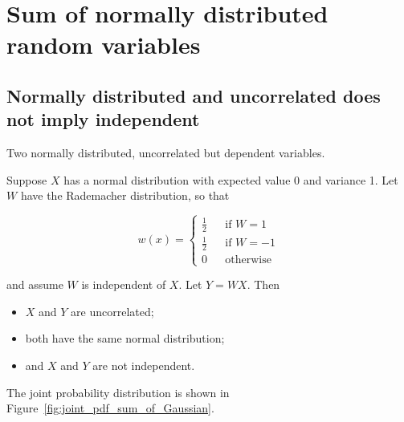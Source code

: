 

\section{Sum of normally distributed random variables}
\label{exer:sum_of_Gaussian}

\subsection{Normally distributed and uncorrelated does not imply independent}

Two normally distributed, uncorrelated but dependent variables.

Suppose $X$ has a normal distribution with expected value 0 and variance 1. Let $W$ have the Rademacher distribution, so that 

\begin{equation}\label{eq:Rademacher_distr}
	w(x) = \left\{
	\begin{array}{ccl}
		\frac{1}{2} & & {\textrm{if } W = 1}\\
		\frac{1}{2} & & {\textrm{if } W = - 1}\\
		0 & & {\textrm{otherwise}}
	\end{array} \right.
\end{equation}

and assume $W$ is independent of $X$. Let $Y=WX$. Then
\begin{itemize}
	\item $X$ and $Y$ are uncorrelated;
	\item both have the same normal distribution;
	\item and $X$ and $Y$ are not independent.
\end{itemize}

The joint probability distribution is shown in Figure~\ref{fig:joint_pdf_sum_of_Gaussian}.

